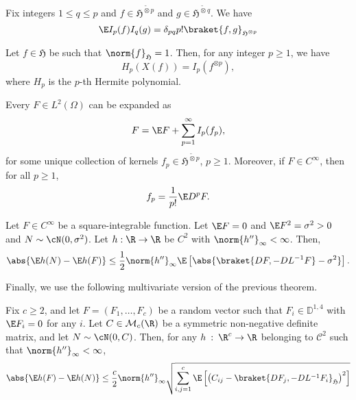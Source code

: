 \begin{proposition}
    Fix integers \(1 \leq q \leq p\) and \(f \in \mathfrak{H}^{\tilde \otimes p}\) and \(g \in \mathfrak{H}^{\tilde \otimes q}\).
    We have
    \begin{equation}
        \E I_p(f) I_q(g) = \delta_{pq} p! \braket{f, g}_{\mathfrak{H}^{\otimes p}}
    \end{equation}
\end{proposition}
\begin{theorem}
    Let \(f \in \mathfrak{H}\) be such that \(\norm{f}_{\mathfrak{H}} = 1\). Then, for any integer \(p \geq 1\), we have
    \begin{equation}
        H_p(X(f)) = I_p(f^{\otimes p}),
    \end{equation}
    where $H_p$ is the $p$-th Hermite polynomial. 
\end{theorem}
\begin{corollary}
\label{cor:wiener_chaos_general}
    Every \(F \in L^2(\Omega)\) can be expanded as 
    \begin{equation}
        F = \E F + \sum_{p = 1}^{\infty} I_p(f_p),
    \end{equation}
    for some unique collection of kernels \(f_p \in \mathfrak{H}^{\tilde \otimes p}\), \(p \geq 1\).
    Moreover, if \(F \in C^{\infty}\), then for all \(p \geq 1\), 
    \begin{equation}
        f_p = \frac{1}{p!}\E D^{p} F.
    \end{equation}
\end{corollary}
\begin{theorem}
\label{thm:clt}
    Let \(F \in C^{\infty}\) be a square-integrable function. Let \(\E F = 0\) and \(\E F^2 = \sigma^2 > 0\) and \(N \sim \cN(0, \sigma^2)\).
    Let \(h: \R \to \R\) be \(C^2\) with \(\norm{h''}_{\infty} < \infty\).
    Then,
    \begin{equation}
        \abs{\E h(N) - \E h(F)} \leq \frac{1}{2} \norm{h''}_{\infty} \E \left[ \abs{\braket{DF, -D L^{-1} F} - \sigma^2}\right].
    \end{equation}
\end{theorem}
Finally, we use the following multivariate version of the previous theorem.
\begin{theorem}
\label{thm:multi-clt}
    Fix \(c \geq 2\), and let \(F = (F_1, \ldots, F_c)\) be a random vector such that \(F_i \in \mathbb{D}^{1, 4}\)
    with \(\E F_i = 0\) for any \(i\).
    Let \(C \in \mathcal{M}_c(\R)\) be a symmetric non-negative definite matrix,
    and let \(N \sim \cN(0, C)\).
    Then, for any \(h\: : \: \R^c \to \R\) belonging to \(\mathcal{C}^2\)
    such that \(\norm{h''}_{\infty} < \infty\),
    \begin{equation}
        \abs{\E h(F) - \E h(N)} \leq \frac{c}{2} \norm{h''}_{\infty} \sqrt{\sum_{i,j=1}^c \E \left[\left(C_{ij} - \braket{D F_j, -DL^{-1}F_i}_{\mathfrak{H}}\right)^2\right]}
    \end{equation}
\end{theorem}

